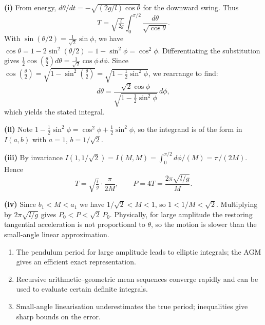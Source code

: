 \begin{solution}

\begin{center}
\end{center}

\textbf{(i)} From energy, $d\theta/dt=-\sqrt{(2g/l)\cos\theta}$ for the downward swing. Thus
\[T=\sqrt{\tfrac{l}{2g}}\int_0^{\pi/2}\frac{d\theta}{\sqrt{\cos\theta}}.
\]
With $\sin(\theta/2)=\tfrac{1}{\sqrt2}\sin\phi$, we have $\cos\theta = 1 - 2\sin^2(\theta/2) = 1 - \sin^2\phi = \cos^2\phi$.
Differentiating the substitution gives $\frac{1}{2}\cos\left(\frac{\theta}{2}\right) d\theta = \frac{1}{\sqrt{2}}\cos\phi \, d\phi$. 
Since $\cos\left(\frac{\theta}{2}\right) = \sqrt{1 - \sin^2\left(\frac{\theta}{2}\right)} = \sqrt{1 - \frac{1}{2}\sin^2\phi}$, we rearrange to find:
\[d\theta=\frac{\sqrt{2}\cos\phi}{\sqrt{1-\tfrac{1}{2}\sin^2\phi}}\,d\phi,
\]
which yields the stated integral.

\textbf{(ii)} Note $1-\tfrac{1}{2}\sin^2\phi=\cos^2\phi+\tfrac{1}{2}\sin^2\phi$, so the integrand is of the form in $I(a,b)$ with $a=1$, $b=1/\sqrt2$.

\textbf{(iii)} By invariance $I(1,1/\sqrt2)=I(M,M)=\int_0^{\pi/2}d\phi/(M)=\pi/(2M)$. Hence
\[T=\sqrt{\tfrac{l}{g}}\cdot\frac{\pi}{2M},\qquad P=4T=\frac{2\pi\sqrt{l/g}}{M}.
\]

\textbf{(iv)} Since $b_1< M< a_1$ we have $1/\sqrt2< M<1$, so $1<1/M<\sqrt2$. Multiplying by $2\pi\sqrt{l/g}$ gives $P_0<P<\sqrt2\,P_0$. Physically, for large amplitude the restoring tangential acceleration is not proportional to $\theta$, so the motion is slower than the small-angle linear approximation.
\end{solution}

\begin{takeaways}
\begin{enumerate}
    \item The pendulum period for large amplitude leads to elliptic integrals; the AGM gives an efficient exact representation.
    \item Recursive arithmetic–geometric mean sequences converge rapidly and can be used to evaluate certain definite integrals.
    \item Small-angle linearisation underestimates the true period; inequalities give sharp bounds on the error.
\end{enumerate}
\end{takeaways}


